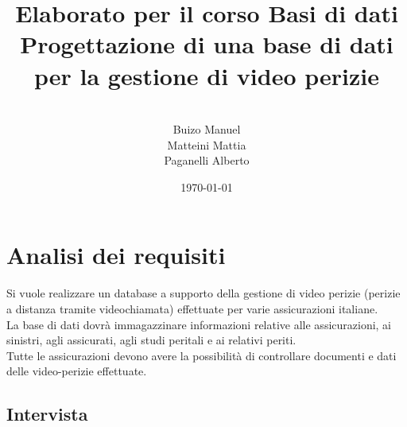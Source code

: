 \documentclass[a4paper,12pt]{report}
\title{\textbf{Elaborato per il corso Basi di dati}
Progettazione di una base di dati per la gestione di video perizie}
\author{
\\Buizo Manuel
\\Matteini Mattia
\\Paganelli Alberto
}
\date{\today}
\begin{document}
\maketitle

\tableofcontents

\chapter{Analisi dei requisiti}

Si vuole realizzare un database a supporto della gestione di video perizie (perizie a distanza tramite videochiamata) effettuate per varie assicurazioni italiane.
\\
La base di dati dovrà immagazzinare informazioni relative alle assicurazioni, ai sinistri, agli assicurati, agli studi peritali e ai relativi periti.
\\
Tutte le assicurazioni devono avere la possibilità di controllare documenti e dati delle video-perizie effettuate.


\section{Intervista }
\end{document}
